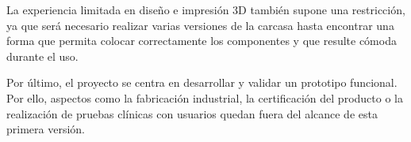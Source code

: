 La experiencia limitada en diseño e impresión 3D también supone una restricción, ya que será necesario realizar varias versiones de la carcasa hasta encontrar una forma que permita colocar correctamente los componentes y que resulte cómoda durante el uso.

Por último, el proyecto se centra en desarrollar y validar un prototipo funcional. Por ello, aspectos como la fabricación industrial, la certificación del producto o la realización de pruebas clínicas con usuarios quedan fuera del alcance de esta primera versión.

